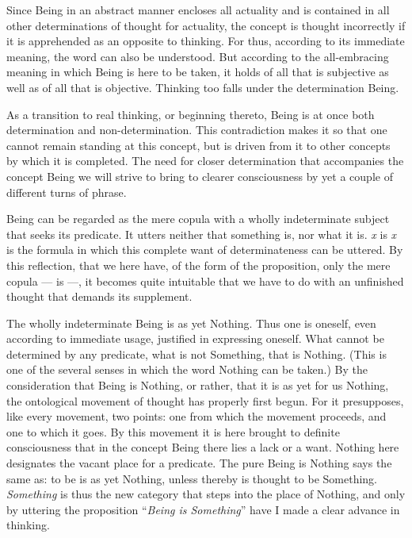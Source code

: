 \documentclass[12pt]{article}
\newcommand{\opage}[1]{\marginnote{\footnotesize\textit{[#1]}}}
\begin{document}
Since Being in an abstract manner encloses all actuality and is contained in all other
determinations of thought for actuality, the concept is thought incorrectly if it is
apprehended as an opposite to thinking. For thus, according to its immediate meaning,
the word can also be understood. But according to the all-embracing meaning in which
Being is here to be taken, it holds of all that is subjective as well as of all that is
objective. Thinking too falls under the determination Being.

As a transition to real thinking, or beginning thereto, Being is at once both
determination and non-determination. This contradiction makes it so that one cannot
remain standing at this concept, but is driven from it to other concepts by which it is
completed. The need for closer determination that accompanies the concept Being we will
strive to bring to clearer consciousness by yet a couple of different turns of phrase.

Being can be regarded as the mere copula with a wholly indeterminate subject that seeks
its predicate. It utters neither that something is, nor what it is. \textit{x} is
\textit{x} is the formula in which this complete want of determinateness can be uttered.
By this \opage{211}reflection, that we here have, of the form of the proposition, only
the mere copula --- is ---, it becomes quite intuitable that we have to do with an
unfinished thought that demands its supplement.

The wholly indeterminate Being is as yet Nothing. Thus one is oneself, even according to
immediate usage, justified in expressing oneself. What cannot be determined by any
predicate, what is not Something, that is Nothing. (This is one of the several senses in
which the word Nothing can be taken.) By the consideration that Being is Nothing, or
rather, that it is as yet for us Nothing, the ontological movement of thought has
properly first begun. For it presupposes, like every movement, two points: one from
which the movement proceeds, and one to which it goes. By this movement it is here
brought to definite consciousness that in the concept Being there lies a lack or a want.
Nothing here designates the vacant place for a predicate. The pure Being is Nothing says
the same as: to be is as yet Nothing, unless thereby is thought to be Something.
\emph{Something} is thus the new category that steps into the place of Nothing, and only
by uttering the proposition ``\emph{Being is Something}'' have I made a clear advance in
thinking.
\end{document}
